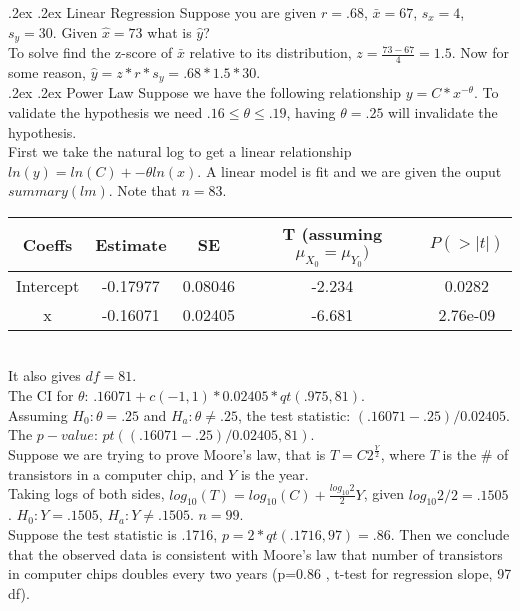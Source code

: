 \documentclass[10pt,landscape]{article}
\makeatletter
\renewcommand{\subsection}{\@startsection{subsection}{2}{0mm}%
                                {.2ex}%
                                {.2ex}%
                                {\normalfont\normalsize\bfseries}}
\makeatother
\begin{document}
\begin{multicols}{3}
\subsection{Linear Regression}
Suppose you are given $r = .68$, $\bar{x} = 67$, $s_x = 4$, $s_y = 30$. Given $\hat{x} = 73$ what is $\hat{y}$? \\
To solve find the z-score of $\bar{x}$ relative to its distribution, $z = \frac{73 - 67}{4} = 1.5$. Now for some reason, $\hat{y} = z * r * s_y = .68 * 1.5 * 30$. \\

\subsection{Power Law}
Suppose we have the following relationship $y = C * x^{-\theta}$. To validate the hypothesis we need $.16 \leq \theta \leq .19$, having $\theta = .25$ will invalidate the hypothesis. \\
First we take the natural log to get a linear relationship $ln(y) = ln(C) + -\theta ln(x)$. A linear model is fit and we are given the ouput $summary(lm)$. Note that $n = 83$. \\
\begin{tabular}{@{}c@{}|@{}c@{}|@{}c@{}|@{}c@{}|@{}c@{}}
        Coeffs & Estimate & SE & T (assuming $\mu_{X_0} = \mu_{Y_0})$ & $P(> |t|)$ \\
        \hline
        Intercept & -0.17977 & 0.08046 & -2.234 & 0.0282 \\
        x & -0.16071 & 0.02405 & -6.681 & 2.76e-09 \\
\end{tabular} \\
It also gives $df = 81$. \\
The CI for $\theta$: $.16071 + c(-1, 1) * 0.02405 * qt(.975, 81)$. \\
Assuming $H_0: \theta = .25$ and $H_a: \theta \ne .25$, the test statistic: $(.16071 - .25) / 0.02405$. The $p-value$: $pt((.16071 - .25) / 0.02405, 81)$. \\
Suppose we are trying to prove Moore's law, that is $T = C2^{\frac{Y}{2}}$, where $T$ is the \# of transistors in a computer chip, and $Y$ is the year. \\
Taking logs of both sides, $log_{10}(T) = log_{10}(C) + \frac{log_{10}2}{2}Y$, given $log_{10}2 / 2 = .1505$. $H_0: Y = .1505$, $H_a: Y \ne .1505$. $n = 99$. \\
Suppose the test statistic is .1716, $p = 2 * qt(.1716, 97) = .86$. Then we conclude that the observed data is consistent with Moore’s law that number of transistors in computer chips doubles every two years (p=0.86
, t-test for regression slope, 97 df).


\end{multicols}
\end{document}
